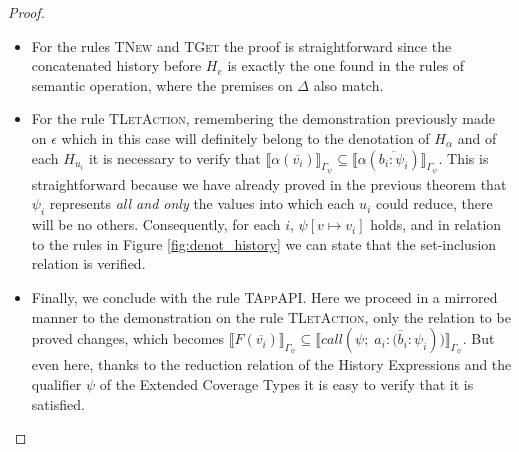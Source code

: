 \begin{proof}
\begin{itemize}
        \item For the rules \textsc{TNew} and \textsc{TGet} the proof is straightforward since the concatenated history before $H_e$ is exactly the one found in the rules of semantic operation, where the premises on $\Delta$ also match.
        \item For the rule \textsc{TLetAction}, remembering the demonstration previously made on $\epsilon$ which in this case will definitely belong to the denotation of $H_{\alpha}$ and of each $H_{u_i}$ it is necessary to verify that $\llbracket \alpha(\overline{v_i}) \rrbracket_{\Gamma_{\psi}} \subseteq \llbracket \alpha(\overline{b_i{:}\psi_i}) \rrbracket_{\Gamma_{\psi}}$. This is straightforward because we have already proved in the previous theorem that $\psi_i$ represents \emph{all and only} the values into which each $u_i$ could reduce, there will be no others. Consequently, for each $i$, $\psi[v \mapsto v_i]$ holds, and in relation to the rules in Figure \ref{fig:denot_history} we can state that the set-inclusion relation is verified.
        \item Finally, we conclude with the rule \textsc{TAppAPI}. Here we proceed in a mirrored manner to the demonstration on the rule \textsc{TLetAction}, only the relation to be proved changes, which becomes $\llbracket F(\overline{v_i}) \rrbracket_{\Gamma_{\psi}} \subseteq \llbracket call(\psi; \;\overline{a_i{:}(b_i{:}\psi_i})) \rrbracket_{\Gamma_{\psi}}$. But even here, thanks to the reduction relation of the History Expressions and the qualifier $\psi$ of the Extended Coverage Types it is easy to verify that it is satisfied.
    \end{itemize}
\end{proof}